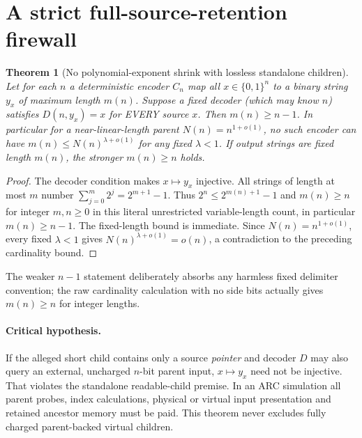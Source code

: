 \documentclass[11pt]{article}
\newtheorem{theorem}{Theorem}
\begin{document}
\section{A strict full-source-retention firewall}
\begin{theorem}[No polynomial-exponent shrink with lossless standalone children]
Let for each $n$ a deterministic encoder $C_n$ map all
$x\in\{0,1\}^n$ to a binary string $y_x$ of maximum length $m(n)$.
Suppose a fixed decoder (which may know $n$) satisfies
$D(n,y_x)=x$ for EVERY source $x$. Then
$m(n)\ge n-1$.
In particular for a near-linear-length parent
$N(n)=n^{1+o(1)}$, no such encoder can have
$m(n)\le N(n)^{\lambda+o(1)}$ for any fixed $\lambda<1$.
If output strings are fixed length $m(n)$, the stronger $m(n)\ge n$
holds.
\end{theorem}
\begin{proof}
The decoder condition makes $x\mapsto y_x$ injective.
All strings of length at most $m$ number
$\sum_{j=0}^{m}2^j=2^{m+1}-1$.
Thus $2^n\le 2^{m(n)+1}-1$ and
$m(n)\ge n$ for integer $m,n\ge0$ in this literal
unrestricted variable-length count, in particular
$m(n)\ge n-1$. The fixed-length bound is immediate.
Since $N(n)=n^{1+o(1)}$, every fixed
$\lambda<1$ gives $N(n)^{\lambda+o(1)}=o(n)$,
a contradiction to the preceding cardinality bound.
\end{proof}
The weaker $n-1$ statement deliberately absorbs any harmless
fixed delimiter convention; the raw cardinality calculation
with no side bits actually gives $m(n)\ge n$ for integer lengths.

\paragraph{Critical hypothesis.}
If the alleged short child contains only a source
\emph{pointer} and decoder $D$ may also query an
external, uncharged $n$-bit parent input, $x\mapsto y_x$
need not be injective. That violates the standalone
readable-child premise. In an ARC simulation all parent
probes, index calculations, physical or virtual input
presentation and retained ancestor memory must be paid.
This theorem never excludes fully charged parent-backed
virtual children.
\end{document}
